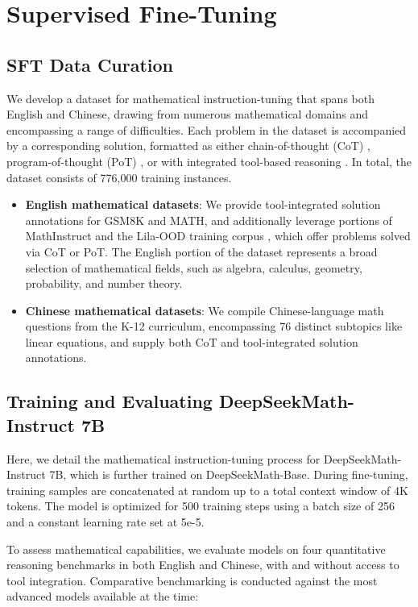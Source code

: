 \section{Supervised Fine-Tuning}

\subsection{SFT Data Curation}

We develop a dataset for mathematical instruction-tuning that spans both English and Chinese, drawing from numerous mathematical domains and encompassing a range of difficulties. Each problem in the dataset is accompanied by a corresponding solution, formatted as either chain-of-thought (CoT) \citep{cot}, program-of-thought (PoT) \citep{pot,pal}, or with integrated tool-based reasoning \citep{tora}. In total, the dataset consists of 776,000 training instances.

\begin{itemize}[topsep=0pt]
    \item \textbf{English mathematical datasets}: We provide tool-integrated solution annotations for GSM8K and MATH, and additionally leverage portions of MathInstruct \citep{MathInstruct} and the Lila-OOD training corpus \citep{lila}, which offer problems solved via CoT or PoT. The English portion of the dataset represents a broad selection of mathematical fields, such as algebra, calculus, geometry, probability, and number theory.
    \item \textbf{Chinese mathematical datasets}: We compile Chinese-language math questions from the K-12 curriculum, encompassing 76 distinct subtopics like linear equations, and supply both CoT and tool-integrated solution annotations.
\end{itemize}

\subsection{Training and Evaluating DeepSeekMath-Instruct 7B}

Here, we detail the mathematical instruction-tuning process for DeepSeekMath-Instruct 7B, which is further trained on DeepSeekMath-Base. During fine-tuning, training samples are concatenated at random up to a total context window of 4K tokens. The model is optimized for 500 training steps using a batch size of 256 and a constant learning rate set at 5e-5.

To assess mathematical capabilities, we evaluate models on four quantitative reasoning benchmarks in both English and Chinese, with and without access to tool integration. Comparative benchmarking is conducted against the most advanced models available at the time:

